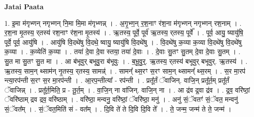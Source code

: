 \documentclass[17pt]{extarticle}
\begin{document}
\textbf{Jatai Paata} \newline

1. इ॒मा म॑गृभ्णन् नगृभ्णन् नि॒मा मि॒मा म॑गृभ्णन्न् । . अ॒गृ॒भ्ण॒न् र॒श॒नाꣳ र॑श॒ना म॑गृभ्णन् नगृभ्णन् रश॒नाम् । . र॒श॒ना मृ॒तस्य॒ र्‌तस्य॑ रश॒नाꣳ र॑श॒ना मृ॒तस्य॑ । . ऋ॒तस्य॒ पूर्वे॒ पूर्व॑ ऋ॒तस्य॒ र्‌तस्य॒ पूर्वे᳚ । . पूर्व॒ आयु॒ ष्यायु॑षि॒ पूर्वे॒ पूर्व॒ आयु॑षि । . आयु॑षि वि॒दथे॑षु वि॒दथे॒ ष्वायु॒ ष्यायु॑षि वि॒दथे॑षु । . वि॒दथे॑षु क॒व्या क॒व्या वि॒दथे॑षु वि॒दथे॑षु क॒व्या । . क॒व्येति॑ क॒व्या । . तया॑ दे॒वा दे॒वा स्तया॒ तया॑ दे॒वाः । . दे॒वाः सु॒तꣳ सु॒तम् दे॒वा दे॒वाः सु॒तम् । . सु॒त मा सु॒तꣳ सु॒त मा । . आ ब॑भूवुर् बभूवु॒रा ब॑भूवुः । . ब॒भू॒वु॒र्॒. ऋ॒तस्य॒ र्‌तस्य॑ बभूवुर् बभूवुर्. ऋ॒तस्य॑ । . ऋ॒तस्य॒ साम॒न् थ्साम॑न् नृ॒तस्य॒ र्‌तस्य॒ सामन्न्॑ । . सामन्᳚ थ्स॒रꣳ स॒रꣳ साम॒न् थ्सामन्᳚ थ्स॒रम् । . स॒र मा॒रप॑ न्त्या॒रप॑न्ती स॒रꣳ स॒र मा॒रप॑न्ती । . आ॒रप॒न्तीत्या᳚ - रप॑न्ती । . प्रतू᳚र्तं ॅवाजिन्. वाजि॒न् प्रतू᳚र्त॒म् प्रतू᳚र्तं ॅवाजिन्न् । . प्रतू᳚र्त॒मिति॒ प्र - तू॒र्त॒म् । . वा॒जि॒न् ना वा॑जिन्. वाजि॒न् ना । . आ द्र॑व द्र॒वा द्र॑व । . द्र॒व॒ वरि॑ष्ठां॒ ॅवरि॑ष्ठाम् द्रव द्रव॒ वरि॑ष्ठाम् । . वरि॑ष्ठा॒ मन्वनु॒ वरि॑ष्ठां॒ ॅवरि॑ष्ठा॒ मनु॑ । . अनु॑ सं॒ॅवतꣳ॑ सं॒ॅवत॒ मन्वनु॑ सं॒ॅवत᳚म् । . सं॒ॅवत॒मिति॑ सं - वत᳚म् । . दि॒वि ते॑ ते दि॒वि दि॒वि ते᳚ । . ते॒ जन्म॒ जन्म॑ ते ते॒ जन्म॑ । \newline
\end{document}
